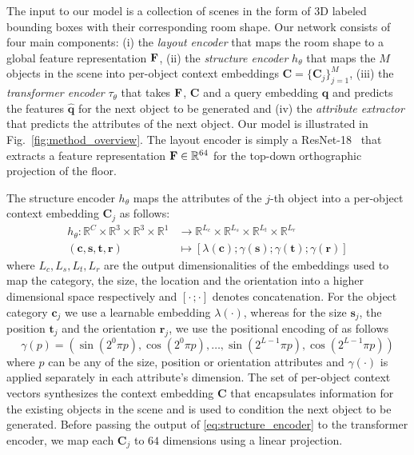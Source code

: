 \documentclass{article}
\newcommand{\bc}{\mathbf{c}}\newcommand{\bC}{\mathbf{C}}
\newcommand{\bq}{\mathbf{q}}\newcommand{\bQ}{\mathbf{Q}}
\newcommand{\br}{\mathbf{r}}\newcommand{\bR}{\mathbf{R}}
\newcommand{\bs}{\mathbf{s}}\newcommand{\bS}{\mathbf{S}}
\newcommand{\bt}{\mathbf{t}}\newcommand{\bT}{\mathbf{T}}
\newcommand{\boldparagraph}[1]{\vspace{0.2cm}\noindent{\bf #1:} }
\newcommand{\figref}[1]{Fig.~\ref{#1}}
\begin{document}
The input to our model is a collection of scenes in the form of $3$D labeled
bounding boxes with their corresponding room shape. Our network
consists of four main components: (i) the \emph{layout encoder} that maps the
room shape to a global feature representation $\mathbf{F}$, (ii) the
\emph{structure encoder} $h_{\theta}$ that maps the $M$ objects in the
scene into per-object context embeddings $\bC=\{\bC_j\}_{j=1}^M$, (iii) the
\emph{transformer encoder} $\tau_{\theta}$ that takes $\mathbf{F}$, $\bC$ and a
query embedding $\bq$ and predicts the features $\hat{\bq}$ for the next object
to be generated and (iv) the \emph{attribute extractor} that predicts the attributes of
the next object. Our model is illustrated in \figref{fig:method_overview}. The
layout encoder is simply a ResNet-18~\cite{He2016CVPR} that extracts
a feature representation $\mathbf{F} \in \mathbb{R}^{64}$ for the top-down orthographic projection of the floor.

\vspace{-2mm}
\boldparagraph{Structure Encoder}The structure encoder $h_{\theta}$ maps the attributes of the $j$-th object into a per-object
context embedding $\bC_j$ as follows:
\begin{equation}
    \begin{split}
    h_{\theta}: \mathbb{R}^C \times \mathbb{R}^3 \times \mathbb{R}^3 \times \mathbb{R}^1 &\rightarrow \mathbb{R}^{L_c} \times \mathbb{R}^{L_s} \times \mathbb{R}^{L_t} \times \mathbb{R}^{L_r} \\
    (\bc, \bs, \bt, \br) &\mapsto [\lambda(\bc); \gamma(\bs); \gamma(\bt); \gamma(\br)]
    \end{split}
    \label{eq:structure_encoder}
\end{equation}
where $L_c, L_s, L_t, L_r$ are the output dimensionalities of the
embeddings used to map the category, the size, the location and the
orientation into a higher dimensional space respectively and $[\cdot\,;\cdot]$ denotes concatenation.
For the object category $\bc_j$ we use a learnable embedding $\lambda(\cdot)$,
whereas for the size $\bs_j$, the position $\bt_j$ and the orientation
$\br_j$, we use the positional encoding of \cite{Vaswani2017NIPS} as follows
\begin{equation}
    \gamma(p) = (\sin(2^0\pi p), \cos(2^0\pi p), \dots, \sin(2^{L-1}\pi p), \cos(2^{L-1}\pi p))
\end{equation}
where $p$ can be any of the size, position or orientation attributes and
$\gamma(\cdot)$ is applied separately in each attribute's dimension.
The set of per-object context vectors synthesizes
the context embedding $\bC$ that encapsulates information for
the existing objects in the scene and is used to condition the
next object to be generated. Before passing the output of
\eqref{eq:structure_encoder} to the transformer encoder, we map each $\bC_j$ to
$64$ dimensions using a linear projection.
\end{document}
